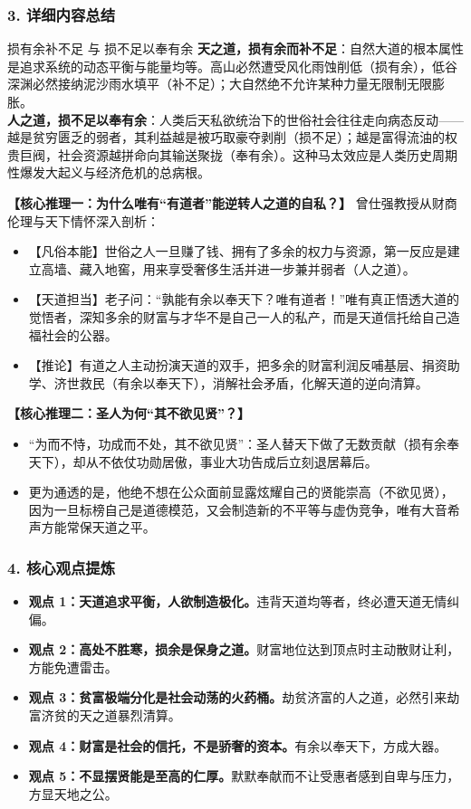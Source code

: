 \subsubsection{3. 详细内容总结}

\begin{ConceptBox}{损有余补不足 与 损不足以奉有余}
\textbf{天之道，损有余而补不足}：自然大道的根本属性是追求系统的动态平衡与能量均等。高山必然遭受风化雨蚀削低（损有余），低谷深渊必然接纳泥沙雨水填平（补不足）；大自然绝不允许某种力量无限制无限膨胀。\\
\textbf{人之道，损不足以奉有余}：人类后天私欲统治下的世俗社会往往走向病态反动——越是贫穷匮乏的弱者，其利益越是被巧取豪夺剥削（损不足）；越是富得流油的权贵巨阀，社会资源越拼命向其输送聚拢（奉有余）。这种马太效应是人类历史周期性爆发大起义与经济危机的总病根。
\end{ConceptBox}

\noindent\textbf{【核心推理一：为什么唯有“有道者”能逆转人之道的自私？】}
曾仕强教授从财商伦理与天下情怀深入剖析：
\begin{itemize}
    \item 【凡俗本能】世俗之人一旦赚了钱、拥有了多余的权力与资源，第一反应是建立高墙、藏入地窖，用来享受奢侈生活并进一步兼并弱者（人之道）。
    \item 【天道担当】老子问：“孰能有余以奉天下？唯有道者！”唯有真正悟透大道的觉悟者，深知多余的财富与才华不是自己一人的私产，而是天道信托给自己造福社会的公器。
    \item 【推论】有道之人主动扮演天道的双手，把多余的财富利润反哺基层、捐资助学、济世救民（有余以奉天下），消解社会矛盾，化解天道的逆向清算。
\end{itemize}

\noindent\textbf{【核心推理二：圣人为何“其不欲见贤”？】}
\begin{itemize}
    \item “为而不恃，功成而不处，其不欲见贤”：圣人替天下做了无数贡献（损有余奉天下），却从不依仗功勋居傲，事业大功告成后立刻退居幕后。
    \item 更为通透的是，他绝不想在公众面前显露炫耀自己的贤能崇高（不欲见贤），因为一旦标榜自己是道德模范，又会制造新的不平等与虚伪竞争，唯有大音希声方能常保天道之平。
\end{itemize}

\subsubsection{4. 核心观点提炼}
\begin{itemize}
    \item \textbf{观点 1：天道追求平衡，人欲制造极化。}违背天道均等者，终必遭天道无情纠偏。
    \item \textbf{观点 2：高处不胜寒，损余是保身之道。}财富地位达到顶点时主动散财让利，方能免遭雷击。
    \item \textbf{观点 3：贫富极端分化是社会动荡的火药桶。}劫贫济富的人之道，必然引来劫富济贫的天之道暴烈清算。
    \item \textbf{观点 4：财富是社会的信托，不是骄奢的资本。}有余以奉天下，方成大器。
    \item \textbf{观点 5：不显摆贤能是至高的仁厚。}默默奉献而不让受惠者感到自卑与压力，方显天地之公。
\end{itemize}

